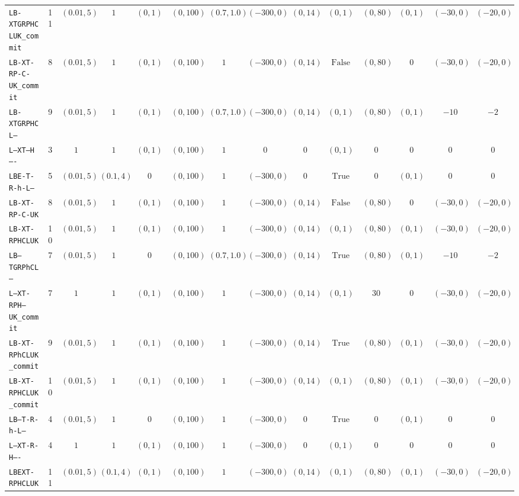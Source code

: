 {\begin{tabular}{lccccccccccccc}
\texttt{LB-XTGRPHCLUK_commit} & 11 & $(0.01,5)$ & $1$ & $(0,1)$ & $(0,100)$ & $(0.7,1.0)$ & $(-300,0)$ & $(0,14)$ & $(0,1)$ & $(0,80)$ & $(0,1)$ & $(-30,0)$ & $(-20,0)$ \\
\texttt{LB-XT-RP-C-UK_commit} & 8 & $(0.01,5)$ & $1$ & $(0,1)$ & $(0,100)$ & $1$ & $(-300,0)$ & $(0,14)$ & $\mathrm{False}$ & $(0,80)$ & $0$ & $(-30,0)$ & $(-20,0)$ \\
\texttt{LB-XTGRPHCL--} & 9 & $(0.01,5)$ & $1$ & $(0,1)$ & $(0,100)$ & $(0.7,1.0)$ & $(-300,0)$ & $(0,14)$ & $(0,1)$ & $(0,80)$ & $(0,1)$ & $-10$ & $-2$ \\
\texttt{L--XT---H----} & 3 & $1$ & $1$ & $(0,1)$ & $(0,100)$ & $1$ & $0$ & $0$ & $(0,1)$ & $0$ & $0$ & $0$ & $0$ \\
\texttt{LBE-T-R-h-L--} & 5 & $(0.01,5)$ & $(0.1,4)$ & $0$ & $(0,100)$ & $1$ & $(-300,0)$ & $0$ & $\mathrm{True}$ & $0$ & $(0,1)$ & $0$ & $0$ \\
\texttt{LB-XT-RP-C-UK} & 8 & $(0.01,5)$ & $1$ & $(0,1)$ & $(0,100)$ & $1$ & $(-300,0)$ & $(0,14)$ & $\mathrm{False}$ & $(0,80)$ & $0$ & $(-30,0)$ & $(-20,0)$ \\
\texttt{LB-XT-RPHCLUK} & 10 & $(0.01,5)$ & $1$ & $(0,1)$ & $(0,100)$ & $1$ & $(-300,0)$ & $(0,14)$ & $(0,1)$ & $(0,80)$ & $(0,1)$ & $(-30,0)$ & $(-20,0)$ \\
\texttt{LB--TGRPhCL--} & 7 & $(0.01,5)$ & $1$ & $0$ & $(0,100)$ & $(0.7,1.0)$ & $(-300,0)$ & $(0,14)$ & $\mathrm{True}$ & $(0,80)$ & $(0,1)$ & $-10$ & $-2$ \\
\texttt{L--XT-RPH--UK_commit} & 7 & $1$ & $1$ & $(0,1)$ & $(0,100)$ & $1$ & $(-300,0)$ & $(0,14)$ & $(0,1)$ & $30$ & $0$ & $(-30,0)$ & $(-20,0)$ \\
\texttt{LB-XT-RPhCLUK_commit} & 9 & $(0.01,5)$ & $1$ & $(0,1)$ & $(0,100)$ & $1$ & $(-300,0)$ & $(0,14)$ & $\mathrm{True}$ & $(0,80)$ & $(0,1)$ & $(-30,0)$ & $(-20,0)$ \\
\texttt{LB-XT-RPHCLUK_commit} & 10 & $(0.01,5)$ & $1$ & $(0,1)$ & $(0,100)$ & $1$ & $(-300,0)$ & $(0,14)$ & $(0,1)$ & $(0,80)$ & $(0,1)$ & $(-30,0)$ & $(-20,0)$ \\
\texttt{LB--T-R-h-L--} & 4 & $(0.01,5)$ & $1$ & $0$ & $(0,100)$ & $1$ & $(-300,0)$ & $0$ & $\mathrm{True}$ & $0$ & $(0,1)$ & $0$ & $0$ \\
\texttt{L--XT-R-H----} & 4 & $1$ & $1$ & $(0,1)$ & $(0,100)$ & $1$ & $(-300,0)$ & $0$ & $(0,1)$ & $0$ & $0$ & $0$ & $0$ \\
\texttt{LBEXT-RPHCLUK} & 11 & $(0.01,5)$ & $(0.1,4)$ & $(0,1)$ & $(0,100)$ & $1$ & $(-300,0)$ & $(0,14)$ & $(0,1)$ & $(0,80)$ & $(0,1)$ & $(-30,0)$ & $(-20,0)$ \\

\end{tabular}}
